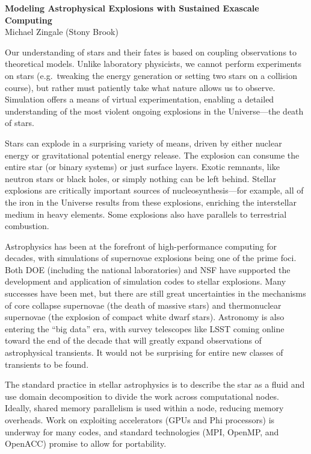 \documentclass[11pt]{article}
\begin{document}
\begin{center}
{\sffamily \bfseries \large Modeling Astrophysical Explosions with Sustained Exascale Computing} \\
Michael Zingale (Stony Brook)
\end{center}

Our understanding of stars and their fates is based on coupling
observations to theoretical models.  Unlike laboratory physicists, we
cannot perform experiments on stars (e.g.\ tweaking the energy
generation or setting two stars on a collision course), but rather must
patiently take what nature allows us to observe.  Simulation offers a means
of virtual experimentation, enabling a detailed understanding of the
most violent ongoing explosions in the Universe---the death of stars.

Stars can explode in a surprising variety of means, driven by either
nuclear energy or gravitational potential energy release.  The
explosion can consume the entire star (or binary systems) or just
surface layers.  Exotic remnants, like neutron stars or black holes, or
simply nothing can be left behind.  Stellar explosions are critically
important sources of nucleosynthesis---for example, all of the iron in
the Universe results from these explosions, enriching the interstellar
medium in heavy elements.  Some explosions also have parallels to
terrestrial combustion.

Astrophysics has been at the forefront of high-performance computing
for decades, with simulations of supernovae explosions being one of
the prime foci.  Both DOE (including the national laboratories) and
NSF have supported the development and application of simulation codes
to stellar explosions.  Many successes have been met, but there are
still great uncertainties in the mechanisms of core collapse
supernovae (the death of massive stars) and thermonuclear supernovae
(the explosion of compact white dwarf stars).  Astronomy is also
entering the ``big data'' era, with survey telescopes like LSST coming
online toward the end of the decade that will greatly expand
observations of astrophysical transients.  It would not be surprising
for entire new classes of transients to be found.

The standard practice in stellar astrophysics is to describe the star
as a fluid and use domain decomposition to divide the work across
computational nodes.  Ideally, shared memory parallelism is used
within a node, reducing memory overheads.  Work on exploiting
accelerators (GPUs and Phi processors) is underway for many codes, and
standard technologies (MPI, OpenMP, and OpenACC) promise to allow for
portability.
\end{document}
